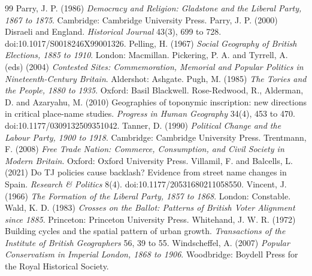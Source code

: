 \documentclass[11pt,a4paper]{article}
\begin{document}
\begin{thebibliography}{99}
 Parry, J. P. (1986) \textit{Democracy and Religion: Gladstone and the Liberal Party, 1867 to 1875}. Cambridge: Cambridge University Press.
 Parry, J. P. (2000) Disraeli and England. \textit{Historical Journal} 43(3), 699 to 728. doi:10.1017/S0018246X99001326.
 Pelling, H. (1967) \textit{Social Geography of British Elections, 1885 to 1910}. London: Macmillan.
 Pickering, P. A. and Tyrrell, A. (eds) (2004) \textit{Contested Sites: Commemoration, Memorial and Popular Politics in Nineteenth-Century Britain}. Aldershot: Ashgate.
 Pugh, M. (1985) \textit{The Tories and the People, 1880 to 1935}. Oxford: Basil Blackwell.
 Rose-Redwood, R., Alderman, D. and Azaryahu, M. (2010) Geographies of toponymic inscription: new directions in critical place-name studies. \textit{Progress in Human Geography} 34(4), 453 to 470. doi:10.1177/0309132509351042.
 Tanner, D. (1990) \textit{Political Change and the Labour Party, 1900 to 1918}. Cambridge: Cambridge University Press.
 Trentmann, F. (2008) \textit{Free Trade Nation: Commerce, Consumption, and Civil Society in Modern Britain}. Oxford: Oxford University Press.
 Villamil, F. and Balcells, L. (2021) Do TJ policies cause backlash? Evidence from street name changes in Spain. \textit{Research \& Politics} 8(4). doi:10.1177/20531680211058550.
 Vincent, J. (1966) \textit{The Formation of the Liberal Party, 1857 to 1868}. London: Constable.
 Wald, K. D. (1983) \textit{Crosses on the Ballot: Patterns of British Voter Alignment since 1885}. Princeton: Princeton University Press.
 Whitehand, J. W. R. (1972) Building cycles and the spatial pattern of urban growth. \textit{Transactions of the Institute of British Geographers} 56, 39 to 55.
 Windscheffel, A. (2007) \textit{Popular Conservatism in Imperial London, 1868 to 1906}. Woodbridge: Boydell Press for the Royal Historical Society.
\end{thebibliography}

\clearpage
\appendix
\end{document}
